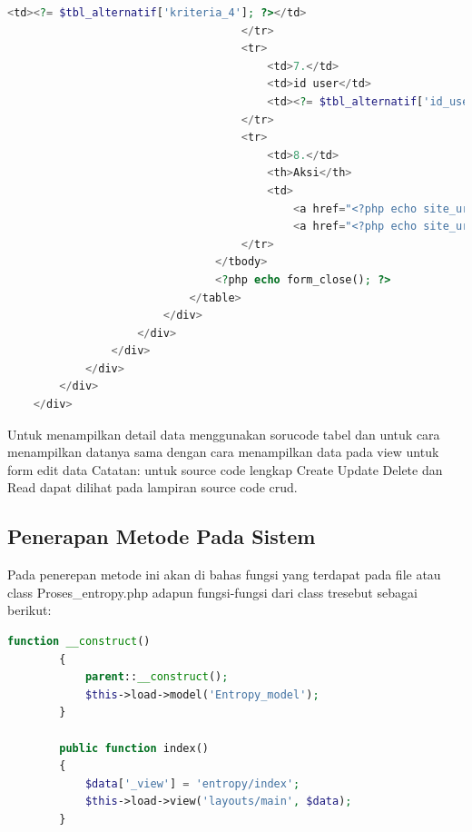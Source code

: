 \begin{lstlisting}[language=PHP]
	                                    <td><?= $tbl_alternatif['kriteria_4']; ?></td>  
	                                </tr>  
	                                <tr>  
	                                    <td>7.</td>  
	                                    <td>id user</td>  
	                                    <td><?= $tbl_alternatif['id_user']; ?></td>  
	                                </tr>  
	                                <tr>  
	                                    <td>8.</td>  
	                                    <th>Aksi</th>  
	                                    <td>  
	                                        <a href="<?php echo site_url('tbl_alternatif/'); ?>" class="btn btn-secondary"><span class="fa fa-pencil"></span> Kembali</a>  
	                                        <a href="<?php echo site_url('tbl_alternatif/edit/' . $tbl_alternatif['alternatif_id']); ?>" class="btn btn-warning"><span class="fas fa-pencil-alt"></span> Edit Data</a></td>  
	                                </tr>  
	                            </tbody>  
	                            <?php echo form_close(); ?>  
	                        </table>  
	                    </div>  
	                </div>  
	            </div>  
	        </div>  
	    </div>  
	</div>  
\end{lstlisting}

Untuk menampilkan detail data menggunakan sorucode tabel dan untuk cara menampilkan datanya sama dengan cara menampilkan data pada view untuk form edit data
Catatan: untuk source code lengkap Create Update Delete dan Read dapat dilihat pada lampiran source code crud.

\subsection{Penerapan Metode Pada Sistem}

Pada penerepan metode ini akan di bahas fungsi yang terdapat pada file atau class Proses\_entropy.php adapun fungsi-fungsi dari class tresebut sebagai berikut:

\begin{lstlisting}[language=PHP]
	    function __construct()  
	    {  
	        parent::__construct();  
	        $this->load->model('Entropy_model');  
	    }  
	  
	    public function index()  
	    {  
	        $data['_view'] = 'entropy/index';  
	        $this->load->view('layouts/main', $data);  
	    }  
\end{lstlisting}

